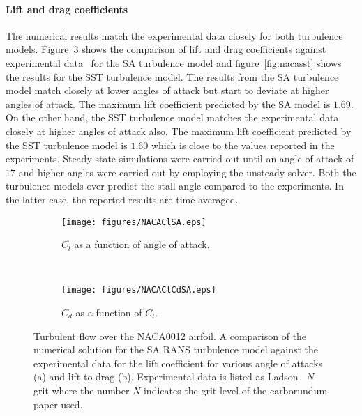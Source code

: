 \paragraph{Lift and drag coefficients}
The numerical results match the experimental data closely for both turbulence models. Figure~\ref{fig:nacasa} shows the comparison of lift and drag coefficients against experimental data~\cite{ladson1988effects} for the SA turbulence model and figure~\ref{fig:nacasst} shows the results for the SST turbulence model. The results from the SA turbulence model match closely at lower angles of attack but start to deviate at higher angles of attack. The maximum lift coefficient predicted by the SA model is $1.69$. On the other hand, the SST turbulence model matches the experimental data closely at higher angles of attack also. The maximum lift coefficient predicted by the SST turbulence model is $1.60$ which is close to the values reported in the experiments. Steady state simulations were carried out until an angle of attack of $17$ and higher angles were carried out by employing the unsteady solver. Both the turbulence models over-predict the stall angle compared to the experiments. In the latter case, the reported results are time averaged.
\begin{figure}[h!]
    \centering
    \captionsetup{justification=centering}
    \begin{subfigure}[b]{0.48\textwidth}
    \centering
    \captionsetup{justification=centering}
       \texttt{[image: figures/NACAClSA.eps]}
        \caption{$C_l$ as a function of angle of attack.}
       \label{fig:nacaclcdsacl}
    \end{subfigure}
    ~ %
          \begin{subfigure}[b]{0.48\textwidth}
    \centering
    \captionsetup{justification=centering}
      \texttt{[image: figures/NACAClCdSA.eps]}
        \caption{$C_d$ as a function of $C_l$.}
       \label{fig:nacaclcdsacd}
    \end{subfigure}        
    \caption{Turbulent flow over the NACA0012 airfoil. A comparison of the numerical solution for the SA RANS turbulence model against the experimental data for the lift coefficient for various angle of attacks (a) and lift to drag (b). Experimental data is listed as Ladson~\cite{ladson1988effects} $N$ grit where the number $N$ indicates the grit level of the carborundum paper used.}
    \label{fig:nacasa}
\end{figure}
